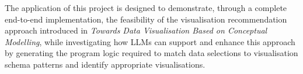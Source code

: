 The application of this project is designed to demonstrate, through a complete end-to-end implementation, the feasibility of the visualisation recommendation approach introduced in \emph{Towards Data Visualisation Based on Conceptual Modelling}\cite{brientowards}, while investigating how LLMs can support and enhance this approach by generating the program logic required to match data selections to visualisation schema patterns and identify appropriate visualisations.






